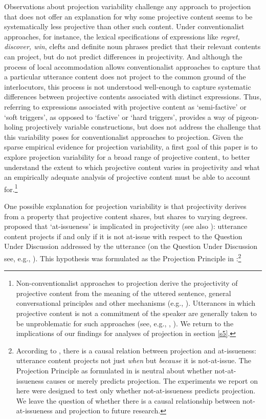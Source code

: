 \documentclass[11pt,fleqn]{article}
\newcommand{\6}{\mbox{$[\hspace*{-.6mm}[$}}
\newcommand{\9}{\mbox{$]\hspace*{-.6mm}]$}}
\begin{document}
Observations about projection variability challenge any approach to projection that does not offer an explanation for why some projective content seems to be systematically less projective than other such content. Under conventionalist approaches, for instance, the lexical specifications of expressions like {\em regret, discover, win}, clefts and definite noun phrases predict that their relevant contents can project, but do not predict differences in projectivity. And although the process of local accommodation allows conventionalist approaches to capture that a particular utterance content does not project to the common ground of the interlocutors, this process is not understood well-enough to capture systematic differences between projective contents associated with distinct expressions. Thus, referring to expressions associated with projective content as `semi-factive' or `soft triggers', as opposed to `factive' or `hard triggers', provides a way of pigeon-holing projectively variable constructions, but does not address the challenge that this variability poses for conventionalist approaches to projection.  Given the sparse empirical evidence for projection variability, a first goal of this paper is to explore projection variability for a broad range of projective content, to better understand the extent to which projective content varies in projectivity and what an empirically adequate analysis of projective content must be able to account for.\footnote{Non-conventionalist approaches to projection derive the projectivity of projective content from the meaning of the uttered sentence, general conversational principles and other mechanisms (e.g., \citealt{stalnaker74,kempson75,levinson83,simons01,abusch10,best-question}). Utterances in which projective content is not a commitment of the speaker are generally taken to be unproblematic for such approaches (see, e.g., \citealt[ch.4]{levinson83}, \citealt[ch.11]{kadmon01}). We return to  the implications of our findings for analyses of projection in section \ref{s5}.}

One possible explanation for projection variability is that projectivity derives from a property that projective content shares, but shares to varying degrees. \citet{brst-salt10} proposed that `at-issueness' is implicated in projectivity (see also \citealt{abrusan2011}): utterance content projects if and only if it is not at-issue with respect to the Question Under Discussion addressed by the utterance (on the Question Under Discussion see, e.g., \citealt{roberts12}). This hypothesis was formulated as the Projection Principle in \citealt[280]{brst-ar}:\footnote{According to \citealt[315]{brst-salt10}, there is a causal relation between projection and at-issueness: utterance content projects not just {\em when} but {\em because} it is not-at-issue. The Projection Principle as formulated in \citealt{brst-ar} is neutral about whether not-at-issueness causes or merely predicts projection. The experiments we report on here were designed to test only whether not-at-issueness predicts projection. We leave the question of whether there is a causal relationship between not-at-issueness and projection to future research.} 
\end{document}
